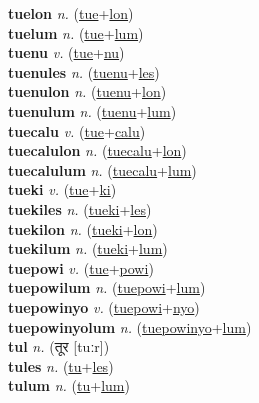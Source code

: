 \textbf{tuelon} \textit{n.} (\hyperref[tue]{tue}+\hyperref[lon]{lon})
 \label{tuelon} \\
\textbf{tuelum} \textit{n.} (\hyperref[tue]{tue}+\hyperref[lum]{lum})
 \label{tuelum} \\
\textbf{tuenu} \textit{v.} (\hyperref[tue]{tue}+\hyperref[nu]{nu})
 \label{tuenu} \\
\textbf{tuenules} \textit{n.} (\hyperref[tuenu]{tuenu}+\hyperref[les]{les})
 \label{tuenules} \\
\textbf{tuenulon} \textit{n.} (\hyperref[tuenu]{tuenu}+\hyperref[lon]{lon})
 \label{tuenulon} \\
\textbf{tuenulum} \textit{n.} (\hyperref[tuenu]{tuenu}+\hyperref[lum]{lum})
 \label{tuenulum} \\
\textbf{tuecalu} \textit{v.} (\hyperref[tue]{tue}+\hyperref[calu]{calu})
 \label{tuecalu} \\
\textbf{tuecalulon} \textit{n.} (\hyperref[tuecalu]{tuecalu}+\hyperref[lon]{lon})
 \label{tuecalulon} \\
\textbf{tuecalulum} \textit{n.} (\hyperref[tuecalu]{tuecalu}+\hyperref[lum]{lum})
 \label{tuecalulum} \\
\textbf{tueki} \textit{v.} (\hyperref[tue]{tue}+\hyperref[ki]{ki})
 \label{tueki} \\
\textbf{tuekiles} \textit{n.} (\hyperref[tueki]{tueki}+\hyperref[les]{les})
 \label{tuekiles} \\
\textbf{tuekilon} \textit{n.} (\hyperref[tueki]{tueki}+\hyperref[lon]{lon})
 \label{tuekilon} \\
\textbf{tuekilum} \textit{n.} (\hyperref[tueki]{tueki}+\hyperref[lum]{lum})
 \label{tuekilum} \\
\textbf{tuepowi} \textit{v.} (\hyperref[tue]{tue}+\hyperref[powi]{powi})
 \label{tuepowi} \\
\textbf{tuepowilum} \textit{n.} (\hyperref[tuepowi]{tuepowi}+\hyperref[lum]{lum})
 \label{tuepowilum} \\
\textbf{tuepowinyo} \textit{v.} (\hyperref[tuepowi]{tuepowi}+\hyperref[nyo]{nyo})
 \label{tuepowinyo} \\
\textbf{tuepowinyolum} \textit{n.} (\hyperref[tuepowinyo]{tuepowinyo}+\hyperref[lum]{lum})
 \label{tuepowinyolum} \\
\textbf{tul} \textit{n.} ({\devanagari{}तूर} [tuːr])
 \label{tul} \\
\textbf{tules} \textit{n.} (\hyperref[tu]{tu}+\hyperref[les]{les})
 \label{tules} \\
\textbf{tulum} \textit{n.} (\hyperref[tu]{tu}+\hyperref[lum]{lum})
